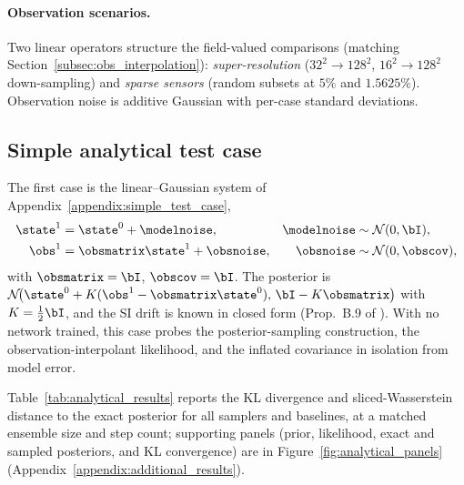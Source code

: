 \paragraph{Observation scenarios.}
Two linear operators structure the field-valued comparisons (matching Section~\ref{subsec:obs_interpolation}): \emph{super-resolution} ($32^2\!\to\!128^2$, $16^2\!\to\!128^2$ down-sampling) and \emph{sparse sensors} (random subsets at $5\%$ and $1.5625\%$). Observation noise is additive Gaussian with per-case standard deviations.

\subsection{Simple analytical test case}
\label{subsec:results_analytical}
The first case is the linear--Gaussian system of Appendix~\ref{appendix:simple_test_case},
\begin{subequations}\label{eq:analytical_system}
\begin{align}
    \state^1 &= \state^{0} + \modelnoise, & \modelnoise &\sim \mathcal{N}(0,\bI),\\
    \obs^1 &= \obsmatrix\state^1 + \obsnoise, & \obsnoise &\sim \mathcal{N}(0,\obscov),
\end{align}
\end{subequations}
with $\obsmatrix=\bI$, $\obscov=\bI$. The posterior is $\mathcal{N}\!\big(\state^0+K(\obs^1-\obsmatrix\state^0),\,\bI-K\obsmatrix\big)$ with $K=\tfrac12\bI$, and the SI drift is known in closed form (Prop.~B.9 of \cite{chen_probabilistic_2024}). With no network trained, this case probes the posterior-sampling construction, the observation-interpolant likelihood, and the inflated covariance in isolation from model error.

Table~\ref{tab:analytical_results} reports the KL divergence and sliced-Wasserstein distance to the exact posterior for all samplers and baselines, at a matched ensemble size and step count; supporting panels (prior, likelihood, exact and sampled posteriors, and KL convergence) are in Figure~\ref{fig:analytical_panels} (Appendix~\ref{appendix:additional_results}).

